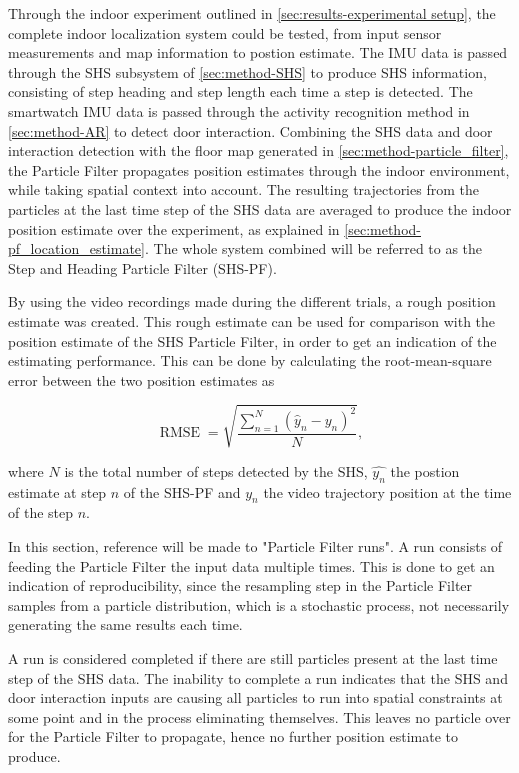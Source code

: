 Through the indoor experiment outlined in \cref{sec:results-experimental setup}, the complete indoor localization system could be tested, from input sensor measurements and map information to postion estimate. The IMU data is passed through the \ac{SHS} subsystem of \cref{sec:method-SHS} to produce \ac{SHS} information, consisting of step heading and step length each time a step is detected. The smartwatch IMU data is passed through the activity recognition method in \cref{sec:method-AR} to  detect door interaction. Combining the \ac{SHS} data and door interaction detection with the floor map generated in \cref{sec:method-particle_filter}, the Particle Filter propagates position estimates through the indoor environment, while taking spatial context into account. The resulting trajectories from the particles at the last time step of the SHS data are averaged to produce the indoor position estimate over the experiment, as explained in \cref{sec:method-pf_location_estimate}. The whole system combined will be referred to as the Step and Heading Particle Filter (SHS-PF).  \par 

By using the video recordings made during the different trials, a rough position estimate was created. This rough estimate can be used for comparison with the position estimate of the \ac{SHS} Particle Filter, in order to get an indication of the estimating performance. This can be done by calculating the root-mean-square error between the two position estimates as

\begin{equation}
	\displaystyle \operatorname {RMSE} ={\sqrt {\frac {\sum _{n=1}^{N}({\hat {y}}_{n}-y_{n})^{2}}{N}}},
	\label{eq:RMSE}
\end{equation}

where $N$ is the total number of steps detected by the SHS, $\hat{y_n}$ the postion estimate at step $n$ of the SHS-PF and $y_n$ the video trajectory position at the time of the step $n$. \par 

In this section, reference will be made to "Particle Filter runs". A run consists of feeding the Particle Filter the input data multiple times. This is done to get an indication of reproducibility, since the resampling step in the Particle Filter samples from a particle distribution, which is a stochastic process, not necessarily generating the same results each time.\par 
A run is considered completed if there are still particles present at the last time step of the SHS data. The inability to complete a run indicates that the SHS and door interaction inputs are causing all particles to run into spatial constraints at some point and in the process eliminating themselves. This leaves no particle over for the Particle Filter to propagate, hence no further position estimate to produce.

